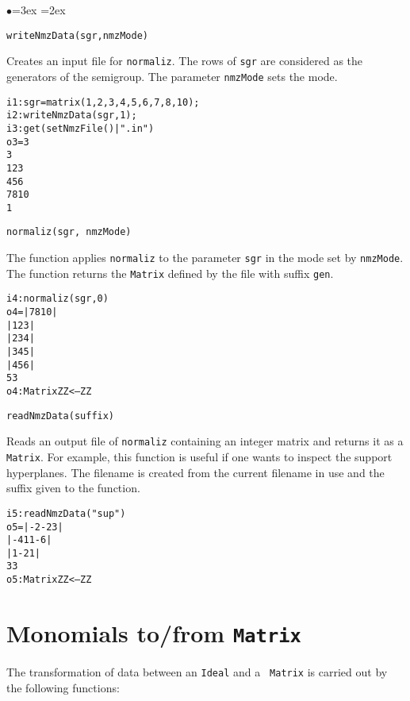 \documentclass[11pt]{amsart}
\newenvironment{example}
  {\begin{alltt}\small}
  {\end{alltt}}
\newenvironment{functions}
  {\begin{list}{$\bullet$}{\leftmargin=3ex \labelwidth=2ex
  \listparindent=0pt \itemsep=6pt \parsep=3pt}}
  {\end{list}}
\begin{document}
\begin{functions}

\item\verb+writeNmzData(sgr,nmzMode)+

Creates an input file for {\tt normaliz}. The rows of {\tt sgr} are
considered as the generators of the semigroup. The parameter
{\verb+nmzMode+} sets the mode.

\begin{example}
i1 : sgr=matrix({{1,2,3},{4,5,6},{7,8,10}});
i2 : writeNmzData(sgr,1);
i3 : get(setNmzFile()|".in") 
o3 = 3
     3
     1 2 3 
     4 5 6 
     7 8 10 
     1
\end{example}

\item\verb+normaliz(sgr, nmzMode)+

The function applies {\tt normaliz} to the parameter {\tt sgr} in
the mode set by \verb+nmzMode+. The function returns the {\tt Matrix} defined by the file with suffix {\tt gen}.
\begin{example}
i4 : normaliz(sgr,0)
o4 = | 7 8 10 |
     | 1 2 3  |
     | 2 3 4  |
     | 3 4 5  |
     | 4 5 6  |
              5        3
o4 : Matrix ZZ  <--- ZZ
\end{example}

\item\verb+readNmzData(suffix)+

Reads an output file of {\tt normaliz} containing an integer
matrix and returns it as a {\tt Matrix}. For example, this function is useful
if one wants to inspect the support hyperplanes. The filename is
created from the current filename in use and the suffix given to
the function.

\begin{example}
i5 : readNmzData("sup")
o5 = | -2 -2 3  |
     | -4 11 -6 |
     | 1  -2 1  |
              3        3
o5 : Matrix ZZ  <--- ZZ
\end{example}

\end{functions}

\section{Monomials to/from {\tt Matrix}}

The transformation of data between an {\tt Ideal} and a {\tt
Matrix} is carried out by the following functions:
\end{document}
